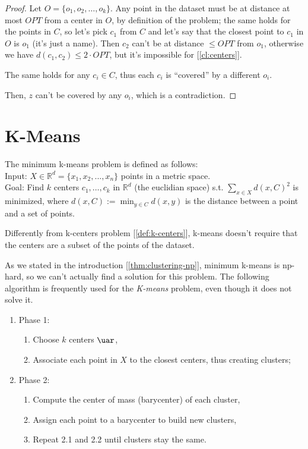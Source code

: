 \begin{proof}
    Let $O = \{o_1, o_2, \ldots, o_k\}$. Any point in the dataset must be at distance at most $OPT$ from a center in $O$, by definition of the problem; the same holds for the points in $C$, so let's pick $c_1$ from $C$ and let's say that the closest point to $c_1$ in $O$ is $o_1$ (it's just a name). Then $c_2$ can't be at distance $\leq OPT$ from $o_1$, otherwise we have $d(c_1, c_2) \leq 2 \cdot OPT$, but it's impossible for [\ref{cl:centers}].
    
    The same holds for any $c_i \in C$, thus each $c_i$ is ``covered'' by a different $o_i$.
    
    Then, $z$ can't be covered by any $o_i$, which is a contradiction.
\end{proof}


\section{K-Means}\label{sec:k-means}

\begin{defn}\label{def:k-means}
    The minimum k-means problem is defined as follows:\\
    Input: $X \in \mathbb{R}^d = \{x_1, x_2, ..., x_n\}$ points in a metric space.\\
    Goal: Find $k$ centers $c_1, \dots, c_k$ in $\mathbb{R}^d$ (the euclidian space) s.t. $\sum_{x \in X} d(x,C)^2$ is minimized, where $d(x,C) := \min_{y \in C} d(x,y)$ is the distance between a point and a set of points.
\end{defn}

\obs Differently from k-centers problem [\ref{def:k-centers}], k-means doesn't require that the centers are a subset of the points of the dataset.

\obs As we stated in the introduction [\ref{thm:clustering-np}], minimum k-means is np-hard, so we can't actually find a solution for this problem. The following algorithm is frequently used for the \textit{K-means} problem, even though it does not solve it.

\begin{enumerate}
    \item Phase 1:
    \begin{enumerate}
        \item Choose $k$ centers $\uar$,
        \item Associate each point in $X$ to the closest centers, thus creating clusters;
    \end{enumerate}
    \item Phase 2:
    \begin{enumerate}
        \item Compute the center of mass (barycenter) of each cluster,
        \item Assign each point to a barycenter to build new clusters,
        \item Repeat 2.1 and 2.2 until clusters stay the same.
    \end{enumerate}
\end{enumerate}

